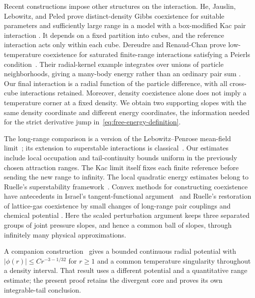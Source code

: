 Recent constructions impose other structures on the interaction.
He, Jauslin, Lebowitz, and Peled prove distinct-density Gibbs coexistence
for suitable parameters and sufficiently large range in a model with a
box-modified Kac pair interaction
\cite[Equation~(1.13) and Theorem~1.3]{HeJauslinLebowitzPeled2025}.
It depends on a fixed partition into cubes, and the reference interaction
acts only within each cube. Dereudre and Renaud-Chan prove
low-temperature coexistence for saturated finite-range interactions
satisfying a Peierls condition~\cite[Theorem~1]{DereudreRenaudChan2026}.
Their radial-kernel example integrates over unions of particle
neighborhoods, giving a many-body energy rather than an ordinary pair sum
\cite[Section~2.3, Example~3, Equation~(2.18)]{DereudreRenaudChan2026}.
Our final interaction is a radial function of the particle difference,
with all cross-cube interactions retained. Moreover, density coexistence
alone does not imply a temperature corner at a fixed density. We obtain
two supporting slopes with the same density coordinate and different
energy coordinates, the information needed for the strict derivative
jump in~\eqref{eq:free-energy-definition}.

The long-range comparison is a version of the Lebowitz--Penrose
mean-field limit~\cite{LebowitzPenrose1966}; its extension to superstable
interactions is classical~\cite{GerardiEtAl1973}. Our estimates include
local occupation and tail-continuity bounds uniform in the previously
chosen attraction ranges. The Kac limit itself fixes each finite reference
before sending the new range to infinity. The local quadratic energy
estimates belong to Ruelle's superstability framework~\cite{Ruelle1970}.
Convex methods for constructing coexistence have antecedents in
Israel's tangent-functional argument~\cite[Theorem~1]{Israel1975}
and Ruelle's restoration of lattice-gas coexistence by small changes of
long-range pair couplings and chemical potential
\cite[Section~5]{Ruelle1977Coexistence}.
Here the scaled perturbation argument keeps three separated groups of
joint pressure slopes, and hence a common ball of slopes, through
infinitely many physical approximations.

A companion construction~\cite[Theorem~1.1]{OpenAIAlgebraic2026}
gives a bounded continuous radial potential with
$|\phi(r)|\le Cr^{-3-1/32}$ for $r\ge1$ and a common temperature
singularity throughout a density interval.
That result uses a different potential and a quantitative range estimate;
the present proof retains the divergent core and proves its own
integrable-tail conclusion.


